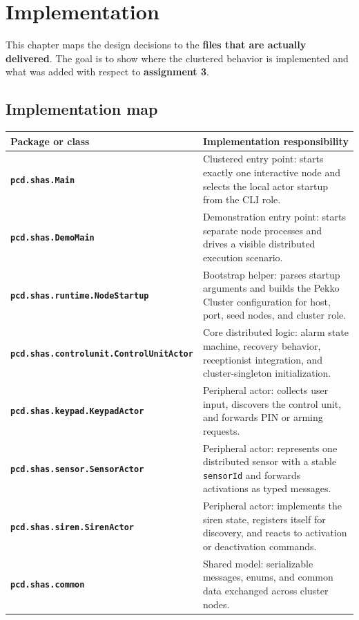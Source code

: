 \clearpage
\section{Implementation}

This chapter maps the design decisions to the \textbf{files that are actually
delivered}. The goal is to show where the clustered behavior is implemented
and what was added with respect to \textbf{assignment 3}.

\subsection{Implementation map}

\begin{center}
{
\small
\begin{tabular}{|>{\raggedright\arraybackslash\bfseries}p{3.5cm}|>{\raggedright\arraybackslash}p{8.8cm}|}
    \hline
    Package or class & Implementation responsibility \\
    \hline
    \texttt{pcd.shas.Main}
        & Clustered entry point: starts exactly one interactive node and selects the local actor startup from the CLI role. \\
    \hline
    \texttt{pcd.shas.DemoMain}
        & Demonstration entry point: starts separate node processes and drives a visible distributed execution scenario. \\
    \hline
    \texttt{pcd.shas.runtime.}\newline\texttt{NodeStartup}
        & Bootstrap helper: parses startup arguments and builds the Pekko Cluster configuration for host, port, seed nodes, and cluster role. \\
    \hline
    \texttt{pcd.shas.controlunit.}\newline\texttt{ControlUnitActor}
        & Core distributed logic: alarm state machine, recovery behavior, receptionist integration, and cluster-singleton initialization. \\
    \hline
    \texttt{pcd.shas.keypad.}\newline\texttt{KeypadActor}
        & Peripheral actor: collects user input, discovers the control unit, and forwards PIN or arming requests. \\
    \hline
    \texttt{pcd.shas.sensor.}\newline\texttt{SensorActor}
        & Peripheral actor: represents one distributed sensor with a stable \texttt{sensorId} and forwards activations as typed messages. \\
    \hline
    \texttt{pcd.shas.siren.}\newline\texttt{SirenActor}
        & Peripheral actor: implements the siren state, registers itself for discovery, and reacts to activation or deactivation commands. \\
    \hline
    \texttt{pcd.shas.common}
        & Shared model: serializable messages, enums, and common data exchanged across cluster nodes. \\
    \hline
\end{tabular}
}
\end{center}

